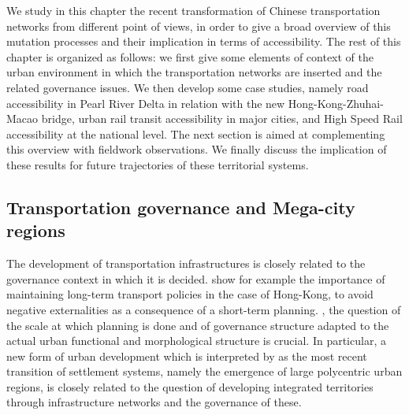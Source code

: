 We study in this chapter the recent transformation of Chinese transportation networks from different point of views, in order to give a broad overview of this mutation processes and their implication in terms of accessibility. The rest of this chapter is organized as follows: we first give some elements of context of the urban environment in which the transportation networks are inserted and the related governance issues. We then develop some case studies, namely road accessibility in Pearl River Delta in relation with the new Hong-Kong-Zhuhai-Macao bridge, urban rail transit accessibility in major cities, and High Speed Rail accessibility at the national level. The next section is aimed at complementing this overview with fieldwork observations. We finally discuss the implication of these results for future trajectories of these territorial systems.





\subsection{Transportation governance and Mega-city regions}


The development of transportation infrastructures is closely related to the governance context in which it is decided. \cite{tang2008impact} show for example the importance of maintaining long-term transport policies in the case of Hong-Kong, to avoid negative externalities as a consequence of a short-term planning.  \cite{aveline2018political} , the question of the scale at which planning is done and of governance structure adapted to the actual urban functional and morphological structure is crucial. In particular, a new form of urban development which is interpreted by \cite{lenechet2017peupler} as the most recent transition of settlement systems, namely the emergence of large polycentric urban regions, is closely related to the question of developing integrated territories through infrastructure networks and the governance of these.


